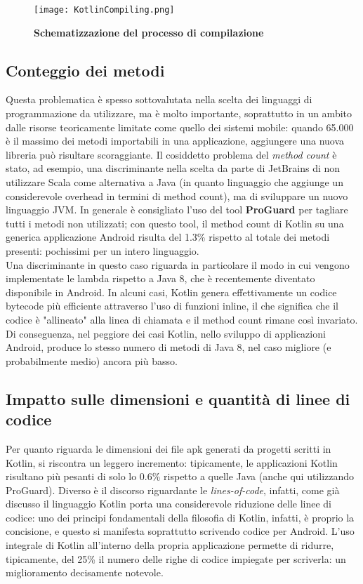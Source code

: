 \begin{figure}[ht]
  \centering
  \texttt{[image: KotlinCompiling.png]}
  \caption{{\bfseries Schematizzazione del processo di compilazione}}
  \label{KotlinCompiling}
\end{figure}

\subsection{Conteggio dei metodi}
Questa problematica è spesso sottovalutata nella scelta dei linguaggi di programmazione da utilizzare, ma è molto importante, soprattutto in un ambito dalle risorse teoricamente limitate come quello dei sistemi mobile: quando 65.000 è il massimo dei metodi importabili in una applicazione, aggiungere una nuova libreria può risultare scoraggiante. Il cosiddetto problema del {\em method count} è stato, ad esempio, una discriminante nella scelta da parte di JetBrains di non utilizzare Scala come alternativa a Java (in quanto linguaggio che aggiunge un considerevole overhead in termini di method count), ma di sviluppare un nuovo linguaggio JVM. In generale è consigliato l'uso del tool {\bfseries ProGuard} \cite{proguard} per tagliare tutti i metodi non utilizzati; con questo tool, il method count di Kotlin su una generica applicazione Android risulta del 1.3\% \cite{ktProductionTales} rispetto al totale dei metodi presenti: pochissimi per un intero linguaggio.\\
Una discriminante in questo caso riguarda in particolare il modo in cui vengono implementate le lambda rispetto a Java 8, che è recentemente diventato disponibile in Android. In alcuni casi, Kotlin genera effettivamente un codice bytecode più efficiente attraverso l'uso di funzioni inline, il che significa che il codice è "allineato" alla linea di chiamata e il method count rimane così invariato. Di conseguenza, nel peggiore dei casi Kotlin, nello sviluppo di applicazioni Android, produce lo stesso numero di metodi di Java 8, nel caso migliore (e probabilmente medio) ancora più basso.\\

\subsection{Impatto sulle dimensioni e quantità di linee di codice}
Per quanto riguarda le dimensioni dei file apk generati da progetti scritti in Kotlin, si riscontra un leggero incremento: tipicamente, le applicazioni Kotlin risultano più pesanti di solo lo 0.6\% rispetto a quelle Java (anche qui utilizzando ProGuard). Diverso è il discorso riguardante le {\em lines-of-code}, infatti, come già discusso il linguaggio Kotlin porta una considerevole riduzione delle linee di codice: uno dei principi fondamentali della filosofia di Kotlin, infatti, è proprio la concisione, e questo si manifesta soprattutto scrivendo codice per Android. L'uso integrale di Kotlin all'interno della propria applicazione permette di ridurre, tipicamente, del 25\% il numero delle righe di codice impiegate per scriverla: un miglioramento decisamente notevole.\\

